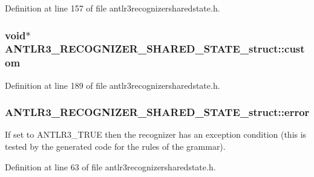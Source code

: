 Definition at line 157 of file antlr3recognizersharedstate.\-h.

\hypertarget{struct_a_n_t_l_r3___r_e_c_o_g_n_i_z_e_r___s_h_a_r_e_d___s_t_a_t_e__struct_ae46c93d1a97bfc10c0b6ca6aec8eea3c}{
\subsubsection[{custom}]{\setlength{\rightskip}{0pt plus 5cm}void$\ast$ A\-N\-T\-L\-R3\-\_\-\-R\-E\-C\-O\-G\-N\-I\-Z\-E\-R\-\_\-\-S\-H\-A\-R\-E\-D\-\_\-\-S\-T\-A\-T\-E\-\_\-struct\-::custom}}\label{struct_a_n_t_l_r3___r_e_c_o_g_n_i_z_e_r___s_h_a_r_e_d___s_t_a_t_e__struct_ae46c93d1a97bfc10c0b6ca6aec8eea3c}


Definition at line 189 of file antlr3recognizersharedstate.\-h.

\hypertarget{struct_a_n_t_l_r3___r_e_c_o_g_n_i_z_e_r___s_h_a_r_e_d___s_t_a_t_e__struct_ac0e7a931ae9898e9a5bdef519f2ad700}{
\subsubsection[{error}]{ A\-N\-T\-L\-R3\-\_\-\-R\-E\-C\-O\-G\-N\-I\-Z\-E\-R\-\_\-\-S\-H\-A\-R\-E\-D\-\_\-\-S\-T\-A\-T\-E\-\_\-struct\-::error}}\label{struct_a_n_t_l_r3___r_e_c_o_g_n_i_z_e_r___s_h_a_r_e_d___s_t_a_t_e__struct_ac0e7a931ae9898e9a5bdef519f2ad700}
If set to A\-N\-T\-L\-R3\-\_\-\-T\-R\-U\-E then the recognizer has an exception condition (this is tested by the generated code for the rules of the grammar). 

Definition at line 63 of file antlr3recognizersharedstate.\-h.

